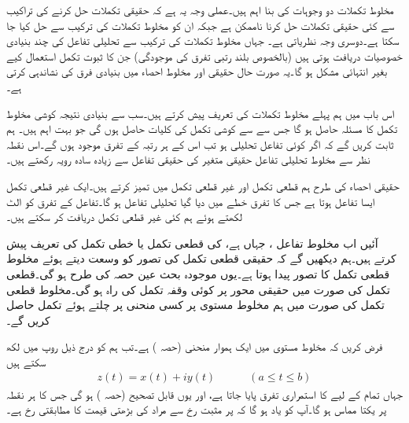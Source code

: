 مخلوط تکملات دو وجوہات کی بنا اہم ہیں۔عملی وجہ یہ ہے کہ حقیقی تکملات حل کرنے کی تراکیب سے کئی حقیقی تکملات حل کرنا ناممکن ہے جبکہ ان کو مخلوط تکملات کی ترکیب سے حل کیا جا سکتا ہے۔دوسری وجہ نظریاتی ہے۔ جہاں مخلوط تکملات کی ترکیب سے تحلیلی تفاعل کی چند بنیادی خصوصیات دریافت ہوتی ہیں (بالخصوص بلند رتبی تفرق کی موجودگی) جن کا ثبوت  تکمل استعمال کیے بغیر انتہائی مشکل ہو گا۔یہ صورت حال حقیقی اور مخلوط احصاء میں بنیادی فرق کی نشاندہی کرتی ہے۔

اس باب میں ہم پہلے مخلوط تکملات کی تعریف پیش کرتے ہیں۔سب سے بنیادی نتیجہ  کوشی مخلوط تکمل کا مسئلہ حاصل ہو گا جس سے  سے کوشی تکمل کی کلیات حاصل ہوں گی جو بہت اہم  ہیں۔ ہم ثابت کریں گے کہ اگر کوئی تفاعل تحلیلی ہو تب اس کے ہر رتبہ کے تفرق موجود ہوں گے۔اس نقطہ نظر سے مخلوط تحلیلی تفاعل حقیقی متغیر کی حقیقی تفاعل سے زیادہ سادہ رویہ رکھتے ہیں۔

حقیقی احصاء کی طرح ہم قطعی تکمل اور غیر قطعی تکمل میں تمیز کرتے ہیں۔ایک غیر قطعی تکمل ایسا تفاعل ہوتا ہے جس کا تفرق خطے میں دیا گیا تحلیلی تفاعل ہو گا۔تفاعل کے تفرق کو الٹ لکھتے ہوئے ہم کئی غیر قطعی تکمل دریافت کر سکتے ہیں۔

آئیں اب مخلوط تفاعل ، جہاں  ہے، کی قطعی تکمل یا خطی تکمل کی تعریف پیش کرتے ہیں۔ہم دیکھیں گے کہ حقیقی قطعی تکمل کی تصور کو وسعت دیتے ہوئے  مخلوط قطعی تکمل کا تصور پیدا ہوتا ہے۔یوں موجودہ بحث عین حصہ  کی طرح ہو گی۔قطعی تکمل کی صورت میں حقیقی محور پر کوئی وقفہ تکمل کی راہ  ہو گی۔مخلوط قطعی تکمل کی صورت میں ہم مخلوط مستوی پر کسی منحنی پر چلتے ہوئے تکمل حاصل کریں گے۔

فرض کریں کہ  مخلوط  مستوی میں  ایک ہموار منحنی (حصہ ) ہے۔تب ہم  کو درج ذیل روپ میں لکھ سکتے ہیں
\begin{align}\label{مساوات_مخلوط_تکمل_راہ_الف}
z(t)=x(t)+iy(t)\quad \quad \quad (a\le t\le b)
\end{align}
جہاں تمام  کے لیے  کا استمراری تفرق  پایا جاتا ہے، اور یوں  قابل تصحیح (حصہ ) ہو گی جس کا ہر نقطہ پر یکتا مماس ہو گا۔آپ کو یاد ہو گا کہ  پر مثبت رخ سے مراد   کی بڑھتی قیمت کا مطابقتی رخ  ہے۔

